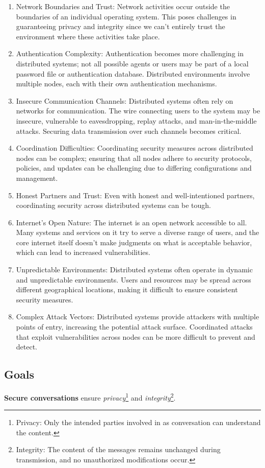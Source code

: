 \documentclass{report}
\newcommand{\definitionBegin}[1]{\begin{tcolorbox}[title={Definition: #1}]}
\newcommand{\definitionEnd}{\end{tcolorbox}}
\begin{document}
\begin{enumerate}[label=\textit{(\roman*)}]
\item Network Boundaries and Trust: Network activities occur outside the boundaries of an individual
  operating system. This poses challenges in guaranteeing privacy and integrity since we can't
  entirely trust the environment where these activities take place.
\item Authentication Complexity: Authentication becomes more challenging in distributed
  systems; not all possible agents or users may be part of a local password file or authentication
  database. Distributed environments involve multiple nodes, each with their own authentication
  mechanisms.
\item Insecure Communication Channels: Distributed systems often rely on networks for
  communication. The wire connecting users to the system may be insecure, vulnerable to eavesdropping,
  replay attacks, and man-in-the-middle attacks. Securing data transmission over such channels becomes
  critical.
\item Coordination Difficulties: Coordinating security measures across distributed nodes can be
  complex; ensuring that all nodes adhere to security protocols, policies, and updates can be
  challenging due to differing configurations and management.
\item Honest Partners and Trust: Even with honest and well-intentioned partners, coordinating
  security across distributed systems can be tough.
\item Internet's Open Nature: The internet is an open network accessible to all. Many systems and
  services on it try to serve a diverse range of users, and the core internet itself doesn't
  make judgments on what is acceptable behavior, which can lead to increased vulnerabilities.
\item Unpredictable Environments: Distributed systems often operate in dynamic and unpredictable
  environments. Users and resources may be spread across different geographical locations, making it
  difficult to ensure consistent security measures.
\item Complex Attack Vectors: Distributed systems provide attackers with multiple points of
  entry, increasing the potential attack surface. Coordinated attacks that exploit vulnerabilities
  across nodes can be more difficult to prevent and detect.
\end{enumerate}


\subsection{Goals}
\definitionBegin{Secure Conversations}
\textbf{Secure conversations} ensure \textit{privacy}\footnote{Privacy: Only the intended parties
  involved in as conversation can understand the content.} and
\textit{integrity}\footnote{Integrity: The content of the messages remains unchanged during
  transmission, and no unauthorized modifications occur.}.
\definitionEnd
\end{document}
